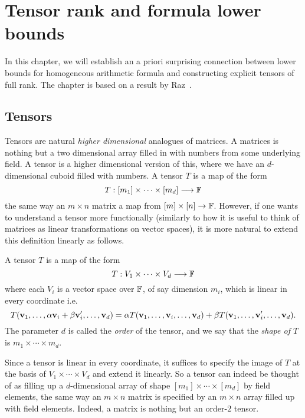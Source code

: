 \chapter{Tensor rank and formula lower bounds}\label{chap:tensorrk}

In this chapter, we will establish an a priori surprising connection between lower bounds for homogeneous arithmetic formula and constructing explicit tensors of full rank.
The chapter is based on a result by Raz~\cite{raz10}.

\section{Tensors}

Tensors are natural \emph{higher dimensional} analogues of matrices.
A matrices is nothing but a two dimensional array filled in with numbers from some underlying field.
A tensor is a higher dimensional version of this, where we have an $d$-dimensional cuboid filled with numbers.
A tensor $T$ is a map of the form
\[
T: [m_1] \times \cdots \times [m_d] \longrightarrow \mathbb{F}
\]
the same way an $m\times n$ matrix a map from $[m] \times [n] \rightarrow \mathbb{F}$.
However, if one wants to understand a tensor more functionally (similarly to how it is useful to think of matrices as linear transformations on vector spaces), it is more natural to extend this definition linearly as follows.

\begin{definition}[Tensor]\label{defn:tensor}
A tensor $T$ is a map of the form 
\[
T: V_1 \times \cdots \times V_d \longrightarrow \mathbb{F}
\]
where each $V_i$ is a vector space over $\mathbb{F}$, of say dimension $m_i$, which is linear in every coordinate i.e.
\[
T(\mathbf{v}_1, \ldots,\alpha\mathbf{v}_i + \beta\mathbf{v}_i', \ldots, \mathbf{v}_d) = \alpha T(\mathbf{v}_1, \ldots,\mathbf{v}_i, \ldots, \mathbf{v}_d) + \beta T(\mathbf{v}_1, \ldots,\mathbf{v}_i', \ldots, \mathbf{v}_d).
\]
The parameter $d$ is called the \emph{order} of the tensor, and we say that the \emph{shape of $T$} is $m_1 \times \cdots \times m_d$.
\end{definition}
Since a tensor is linear in every coordinate, it suffices to specify the image of $T$ at the basis of $V_1 \times \cdots \times V_d$ and extend it linearly.
So a tensor can indeed be thought of as filling up a $d$-dimensional array of shape $[m_1]\times \cdots \times [m_d]$ by field elements, the same way an $m\times n$ matrix is specified by an $m\times n$ array filled up with field elements.
Indeed, a matrix is nothing but an order-$2$ tensor.

